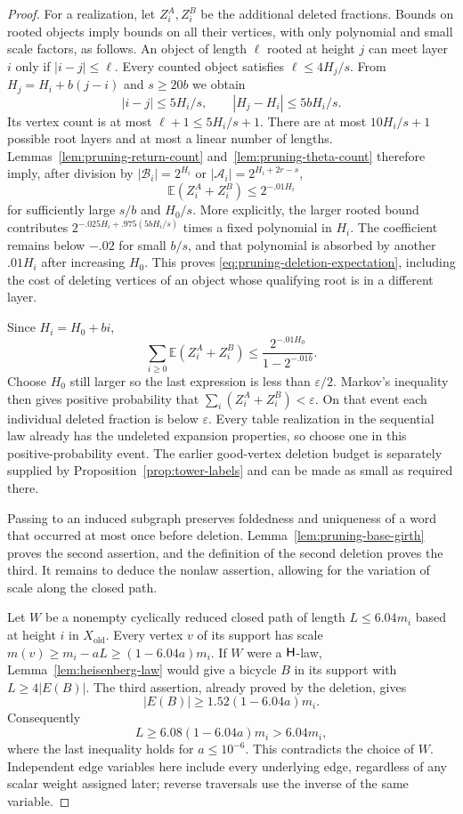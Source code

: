 \begin{proof}
For a realization, let $Z_i^A,Z_i^B$ be the additional deleted
fractions.  Bounds on rooted objects imply bounds on all their
vertices, with only polynomial and small scale factors, as
follows.  An object of length $\ell$ rooted at height $j$
can meet layer $i$ only if $|i-j|\leq\ell$.  Every counted
object satisfies $\ell\leq4H_j/s$.  From
$H_j=H_i+b(j-i)$ and $s\geq20b$ we obtain
\[
 |i-j|\leq5H_i/s,
 \qquad |H_j-H_i|\leq5bH_i/s.
\]
Its vertex count is at most $\ell+1\leq5H_i/s+1$.
There are at most $10H_i/s+1$ possible root layers and at
most a linear number of lengths.  Lemmas~\ref{lem:pruning-return-count}
and~\ref{lem:pruning-theta-count} therefore imply, after division
by $|\mathscr B_i|=2^{H_i}$ or
$|\mathscr A_i|=2^{H_i+2r-s}$,
\begin{equation}
\label{eq:pruning-deletion-expectation}
 \mathbb E(Z_i^A+Z_i^B)\leq2^{-.01H_i}
\end{equation}
for sufficiently large $s/b$ and $H_0/s$.  More explicitly,
the larger rooted bound contributes
$2^{-.025H_i+.975(5bH_i/s)}$ times a fixed polynomial in
$H_i$.  The coefficient remains below $-.02$ for small
$b/s$, and that polynomial is absorbed by another $.01H_i$
after increasing $H_0$.  This proves
\eqref{eq:pruning-deletion-expectation}, including the cost
of deleting vertices of an object whose qualifying root is
in a different layer.

Since $H_i=H_0+bi$,
\[
 \sum_{i\geq0}\mathbb E(Z_i^A+Z_i^B)
 \leq\frac{2^{-.01H_0}}{1-2^{-.01b}}.
\]
Choose $H_0$ still larger so the last expression is less
than $\varepsilon/2$.  Markov's inequality then gives
positive probability that
$\sum_i(Z_i^A+Z_i^B)<\varepsilon$.  On that event each
individual deleted fraction is below $\varepsilon$.
Every table realization in the sequential law already has
the undeleted expansion properties, so choose one in this
positive-probability event.  The earlier good-vertex deletion
budget is separately supplied by Proposition~\ref{prop:tower-labels}
and can be made as small as required there.

Passing to an induced subgraph preserves foldedness and
uniqueness of a word that occurred at most once before
deletion.  Lemma~\ref{lem:pruning-base-girth} proves the
second assertion, and the definition of the second deletion
proves the third.  It remains to deduce the nonlaw assertion, allowing
for the variation of scale along the closed path.

Let $W$ be a nonempty cyclically reduced closed path of length
$L\leq6.04m_i$ based at height $i$ in $X_{\mathrm{old}}$.
Every vertex $v$ of its support has scale
$ m(v)\geq m_i-aL\geq(1-6.04a)m_i$.
If $W$ were a $\mathsf H$-law, Lemma~\ref{lem:heisenberg-law}
would give a bicycle $B$ in its support with $L\geq4|E(B)|$.
The third assertion, already proved by the deletion, gives
\[
 |E(B)|\geq1.52(1-6.04a)m_i.
\]
Consequently
\[
 L\geq6.08(1-6.04a)m_i>6.04m_i,
\]
where the last inequality holds for $a\leq10^{-6}$.
This contradicts the choice of $W$.  Independent edge variables
here include every underlying edge, regardless of any scalar
weight assigned later; reverse traversals use the inverse of
the same variable.
\end{proof}
